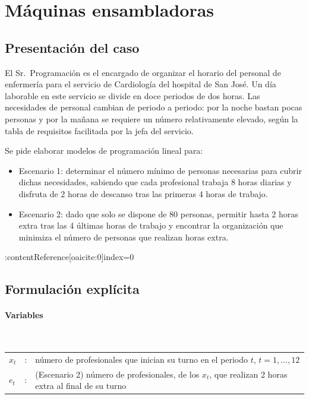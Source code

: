 \section{Máquinas ensambladoras}

\subsection{Presentación del caso}
El Sr.\ Programación es el encargado de organizar el horario del personal de enfermería para el servicio de Cardiología del hospital de San José. Un día laborable en este servicio se divide en doce periodos de dos horas. Las necesidades de personal cambian de periodo a periodo: por la noche bastan pocas personas y por la mañana se requiere un número relativamente elevado, según la tabla de requisitos facilitada por la jefa del servicio. 

\noindent Se pide elaborar modelos de programación lineal para: 

\begin{itemize}
    \item Escenario 1: determinar el número mínimo de personas necesarias para cubrir dichas necesidades, sabiendo que cada profesional trabaja 8 horas diarias y disfruta de 2 horas de descanso tras las primeras 4 horas de trabajo.
    \item Escenario 2: dado que solo se dispone de 80 personas, permitir hasta 2 horas extra tras las 4 últimas horas de trabajo y encontrar la organización que minimiza el número de personas que realizan horas extra.
\end{itemize}:contentReference[oaicite:0]{index=0}

\subsection{Formulación explícita}

\paragraph{Variables}\mbox{}\\
\begin{tabular}{l c l}
    $x_t$  & : & número de profesionales que inician su turno en el periodo $t$, $t=1,\dots,12$\\
    $e_t$  & : & (Escenario 2) número de profesionales, de los $x_t$, que realizan 2 horas extra al final de su turno\\
\end{tabular}

